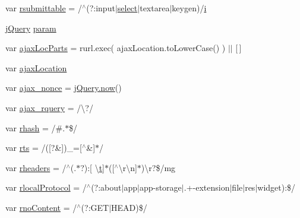 \begin{DoxyCompactItemize}
var \hyperlink{_bibabook_2_scripts_2jquery-1_810_82_8js_a12d248d7e6c5985c5ea21f56fbef9e90}{rsubmittable} = /$^\wedge$(?\+:input$\vert$\hyperlink{jquery-1_810_82-vsdoc_8js_a861f73402c6bb8457b04e4c36686ce8c}{select}$\vert$textarea$\vert$keygen)/\hyperlink{packages_2_respond_81_82_80_2content_2_scripts_2respond_8min_8js_a5e25b1d1bed9ab5f3174b76d6a722180}{i}
\item 
\hyperlink{packages_2j_query_81_810_82_2_content_2_scripts_2jquery-1_810_82_8js_a5e01048fbd3a30b44e8d491d8945c457}{j\+Query} \hyperlink{_bibabook_2_scripts_2jquery-1_810_82_8js_a24ced9cd3c9e1970a8cbe8d7adedc765}{param}
\item 
var \hyperlink{_bibabook_2_scripts_2jquery-1_810_82_8js_a4c35110da3c335cfca38505ee65a5e79}{ajax\+Loc\+Parts} = rurl.\+exec( ajax\+Location.\+to\+Lower\+Case() ) $\vert$$\vert$ \mbox{[}$\,$\mbox{]}
\item 
var \hyperlink{_bibabook_2_scripts_2jquery-1_810_82_8js_a1661d4e1676e7c6ffde5a3cb8d8ae246}{ajax\+Location}
\item 
var \hyperlink{_bibabook_2_scripts_2jquery-1_810_82_8js_aaa43e6d4c76ee8be878dd7e93fb755a4}{ajax\+\_\+nonce} = \hyperlink{jquery-1_810_82-vsdoc_8js_a1ecd248e0e501ce89712536174fdc6e3}{j\+Query.\+now}()
\item 
var \hyperlink{_bibabook_2_scripts_2jquery-1_810_82_8js_a4da85c0011217bf1643139dc23999c5c}{ajax\+\_\+rquery} = /\textbackslash{}?/
\item 
var \hyperlink{_bibabook_2_scripts_2jquery-1_810_82_8js_a6990b6955b6bec9dd39f3814cfb56d6d}{rhash} = /\#.$\ast$\$/
\item 
var \hyperlink{_bibabook_2_scripts_2jquery-1_810_82_8js_a38ff30904f54277281a13514d7aea00d}{rts} = /(\mbox{[}?\&\mbox{]})\+\_\+=\mbox{[}$^\wedge$\&\mbox{]}$\ast$/
\item 
var \hyperlink{_bibabook_2_scripts_2jquery-1_810_82_8js_af506d11612139f03091db71089d92e8b}{rheaders} = /$^\wedge$(.$\ast$?)\+:\mbox{[} \textbackslash{}\hyperlink{packages_2j_query_8_validation_81_811_81_2_content_2_scripts_2jquery_8validate_8min_8js_a23c5666e83bbbceee94adcd0851f50c4}{t}\mbox{]}$\ast$(\mbox{[}$^\wedge$\textbackslash{}r\textbackslash{}n\mbox{]}$\ast$)\textbackslash{}r?\$/mg
\item 
var \hyperlink{_bibabook_2_scripts_2jquery-1_810_82_8js_af4dd13c90298bbf53ce08ec707dc9e2a}{rlocal\+Protocol} = /$^\wedge$(?\+:about$\vert$app$\vert$app-\/storage$\vert$.+-\/extension$\vert$file$\vert$res$\vert$widget)\+:\$/
\item 
var \hyperlink{_bibabook_2_scripts_2jquery-1_810_82_8js_a537d744d72e31ec312aa3f16ef576d3f}{rno\+Content} = /$^\wedge$(?\+:G\+E\+T$\vert$H\+E\+A\+D)\$/
$$
\end{DoxyCompactItemize}
